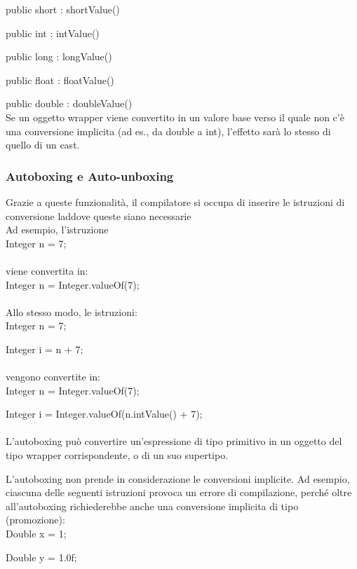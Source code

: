 \documentclass[10pt]{article}
\begin{document}
public short : shortValue()

public int : intValue()

public long : longValue()

public float : floatValue()

public double : doubleValue()\\

Se un oggetto wrapper viene convertito in un valore base verso il quale non c'è una 
conversione implicita (ad es., da double a int), l'effetto sarà lo stesso di quello di un cast.

\subsubsection{Autoboxing e Auto-unboxing}
 Grazie a queste funzionalità, il compilatore si occupa di inserire le istruzioni di conversione laddove queste siano necessarie\\
Ad esempio, l'istruzione\\

Integer n = 7;\\\\
viene convertita in:\\

Integer n = Integer.valueOf(7);\\\\
Allo stesso modo, le istruzioni:\\

Integer n = 7;

Integer i = n + 7;\\\\
vengono convertite in:\\

Integer n = Integer.valueOf(7);

Integer i = Integer.valueOf(n.intValue() + 7);\\\\
L'autoboxing può convertire un'espressione di tipo primitivo in un oggetto del tipo  wrapper corrispondente, o di un suo supertipo.

L'autoboxing non prende in considerazione le conversioni implicite.
Ad esempio, ciascuna delle seguenti istruzioni provoca un errore di compilazione,
perché oltre all'autoboxing richiederebbe anche una conversione implicita di tipo 
(promozione):\\

Double x = 1;

Double y = 1.0f;
\end{document}
